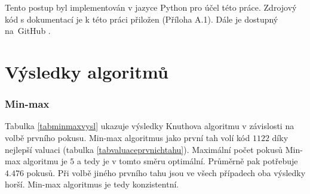 Tento postup byl implementován v jazyce Python pro účel této práce. Zdrojový kód s dokumentací je k této práci přiložen (Příloha A.1). Dále je dostupný na~GitHub \cite{Simsa_Strategies_for_Mastermind_2025}. 





\section{Výsledky algoritmů}

\subsubsection{Min-max}

Tabulka \ref{tabminmaxvysl} ukazuje výsledky Knuthova algoritmu v závislosti na volbě prvního pokusu. Min-max algoritmus jako první tah volí kód $1122$ díky nejlepší valuaci (tabulka \ref{tabvaluaceprvnichtahu}). Maximální počet pokusů Min-max algoritmu je $5$ a tedy je v tomto směru optimální. Průměrně pak potřebuje $4.476$ pokusů. Při volbě jiného prvního tahu jsou ve všech případech oba výsledky horší. Min-max algoritmus je tedy konzistentní.

